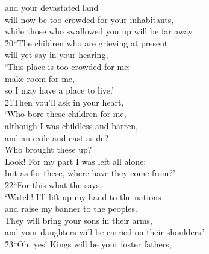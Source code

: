 \begin{poetry}
\poemll    and your devastated land \\
\poeml will now be too crowded for your inhabitants, \\
\poemll    while those who swallowed you up will be far away. \\
\poeml \v{20}``The children who are grieving at present \\
\poemll    will yet say in your hearing, \\
\poeml `This place is too crowded for me; \\
\poemll    make room for me, \\
\poemlll       so I may have a place to live.' \\
\poeml \v{21}Then you'll ask in your heart, \\
\poemll    `Who bore these children for me, \\
\poeml although I was childless and barren, \\
\poemll    and an exile and cast aside? \\
\poeml Who brought these up? \\
\poemll    Look! For my part I was left all alone; \\
\poemlll       but as for these, where have they come from?' \\
\poeml \v{22}``For this what the  says, \\
\poemll    `Watch! I'll lift up my hand to the nations \\
\poeml and raise my banner to the peoples. \\
\poemll    They will bring your sons in their arms, \\
\poemlll       and your daughters will be carried on their shoulders.' \\
\poeml \v{23}``Oh, yes! Kings will be your foster fathers, \\

\end{poetry}
